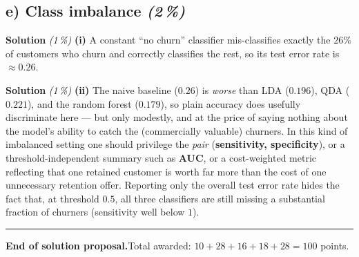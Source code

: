 \documentclass[11pt,a4paper]{article}
\newcommand{\subpoints}[1]{\textit{(#1\,\%)}}
\newcommand{\sol}{\noindent\textbf{Solution}}
\begin{document}
\subsection*{e) Class imbalance \subpoints{2}}

\sol{} \subpoints{1} \textbf{(i)} A constant ``no churn'' classifier mis-classifies exactly the
$26\%$ of customers who churn and correctly classifies the rest, so its test error rate is
$\approx \boxed{0.26}$.

\medskip
\sol{} \subpoints{1} \textbf{(ii)} The naive baseline ($0.26$) is \emph{worse} than LDA ($0.196$),
QDA ($0.221$), and the random forest ($0.179$), so plain accuracy does usefully discriminate
here --- but only modestly, and at the price of saying nothing about the model's ability to catch
the (commercially valuable) churners. In this kind of imbalanced setting one should privilege the
\emph{pair} (\textbf{sensitivity, specificity}), or a threshold-independent summary such as
\textbf{AUC}, or a cost-weighted metric reflecting that one retained customer is worth far more
than the cost of one unnecessary retention offer. Reporting only the overall test error rate
hides the fact that, at threshold $0.5$, all three classifiers are still missing a substantial
fraction of churners (sensitivity well below $1$).

\vspace{1em}
\hrule
\vspace{0.5em}

\noindent\textbf{End of solution proposal.}\quad Total awarded: $10+28+16+18+28=100$ points.
\end{document}
